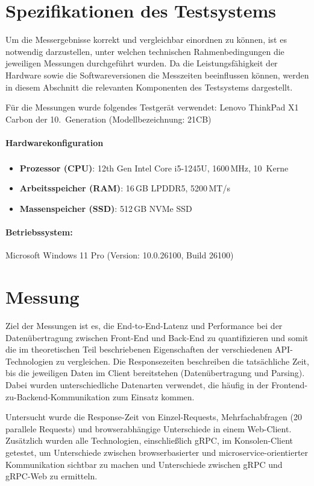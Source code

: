 \clearpage
\section{Spezifikationen des Testsystems}
Um die Messergebnisse korrekt und vergleichbar einordnen zu können, ist es notwendig darzustellen, unter welchen technischen Rahmenbedingungen die jeweiligen Messungen durchgeführt wurden. Da die Leistungsfähigkeit der Hardware sowie die Softwareversionen die Messzeiten beeinflussen können, werden in diesem Abschnitt die relevanten Komponenten des Testsystems dargestellt.

Für die Messungen wurde folgendes Testgerät verwendet:  
Lenovo ThinkPad X1 Carbon der 10.\ Generation (Modellbezeichnung: 21CB)

\paragraph{Hardwarekonfiguration}
\begin{itemize}
	\item \textbf{Prozessor (CPU)}: 12th Gen Intel\textsuperscript{\textregistered} Core\texttrademark{} i5-1245U, 1600\,MHz, 10~Kerne
	\item \textbf{Arbeitsspeicher (RAM)}: 16\,GB LPDDR5, 5200\,MT/s
	\item \textbf{Massenspeicher (SSD)}: 512\,GB NVMe SSD
\end{itemize}

\paragraph{Betriebssystem:}
Microsoft Windows 11 Pro (Version: 10.0.26100, Build 26100)

\clearpage
\section{Messung}
Ziel der Messungen ist es, die End-to-End-Latenz und Performance bei der Datenübertragung zwischen Front-End und Back-End zu quantifizieren und somit die im theoretischen Teil beschriebenen Eigenschaften der verschiedenen API-Technologien zu vergleichen.  
Die Responsezeiten beschreiben die tatsächliche Zeit, bis die jeweiligen Daten im Client bereitstehen (Datenübertragung und Parsing). Dabei wurden unterschiedliche Datenarten verwendet, die häufig in der Frontend-zu-Backend-Kommunikation zum Einsatz kommen.  

Untersucht wurde die Response-Zeit von Einzel-Requests, Mehrfachabfragen (20 parallele Requests) und browserabhängige Unterschiede in einem Web-Client. Zusätzlich wurden alle Technologien, einschließlich gRPC, im Konsolen-Client getestet, um Unterschiede zwischen browserbasierter und microservice-orientierter Kommunikation sichtbar zu machen und Unterschiede zwischen gRPC und gRPC-Web zu ermitteln.

